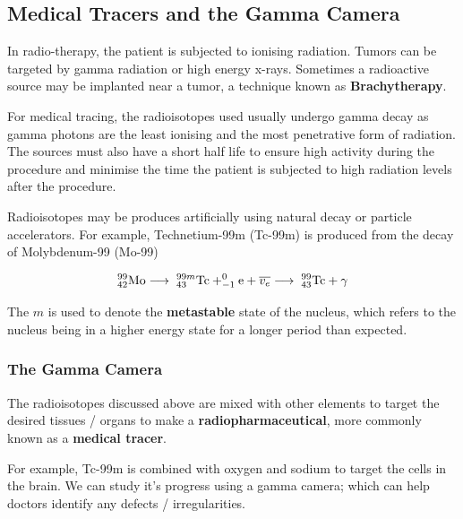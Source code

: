 \subsection{Medical Tracers and the Gamma Camera}

In radio-therapy, the patient is subjected to ionising radiation. Tumors can be targeted by gamma radiation or high energy x-rays. Sometimes a radioactive source may be implanted near a tumor, a technique known as \textbf{Brachytherapy}.

For medical tracing, the radioisotopes used usually undergo gamma decay as gamma photons are the least ionising and the most penetrative form of radiation. The sources must also have a short half life to ensure high activity during the procedure and minimise the time the patient is subjected to high radiation levels after the procedure.  

Radioisotopes may be produces artificially using natural decay or particle accelerators. For example, Technetium-99m (Tc-99m) is produced from the decay of Molybdenum-99 (Mo-99) 

\begin{equation}
    _{42}^{99}\text{Mo} \longrightarrow \hspace{1mm} _{43}^{99m}\text{Tc} + _{-1}^{0}\text{e} + \overline{v_e} \longrightarrow \hspace{1mm} _{43}^{99}\text{Tc} + \gamma 
\end{equation}

The $m$ is used to denote the \textbf{metastable} state of the nucleus, which refers to the nucleus being in a higher energy state for a longer period than expected. 

\subsubsection*{The Gamma Camera}

The radioisotopes discussed above are mixed with other elements to target the desired tissues / organs to make a \textbf{radiopharmaceutical}, more commonly known as a \textbf{medical tracer}. 

For example, Tc-99m is combined with oxygen and sodium to target the cells in the brain. We can study it's progress using a gamma camera; which can help doctors identify any defects / irregularities. 

